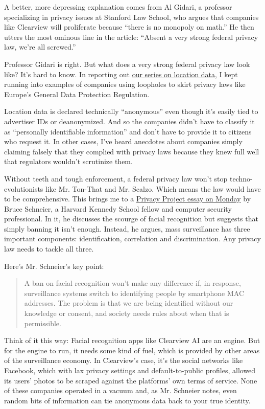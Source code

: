 A better, more depressing explanation comes from Al Gidari, a professor
specializing in privacy issues at Stanford Law School, who argues that
companies like Clearview will proliferate because ``there is no monopoly
on math.'' He then utters the most ominous line in the article: ``Absent
a very strong federal privacy law, we're all screwed.''

Professor Gidari is right. But what does a very strong federal privacy
law look like? It's hard to know. In reporting out
\href{https://www.nytimes.com/interactive/2019/12/19/opinion/location-tracking-cell-phone.html}{our
series on location data}, I kept running into examples of companies
using loopholes to skirt privacy laws like Europe's General Data
Protection Regulation.

Location data is declared technically ``anonymous'' even though it's
easily tied to advertiser IDs or deanonymized. And so the companies
didn't have to classify it as ``personally identifiable information''
and don't have to provide it to citizens who request it. In other cases,
I've heard anecdotes about companies simply claiming falsely that they
complied with privacy laws because they knew full well that regulators
wouldn't scrutinize them.

Without teeth and tough enforcement, a federal privacy law won't stop
techno-evolutionists like Mr. Ton-That and Mr. Scalzo. Which means the
law would have to be comprehensive. This brings me to a
\href{https://www.nytimes.com/2020/01/20/opinion/facial-recognition-ban-privacy.html}{Privacy
Project essay on Monday} by Bruce Schneier, a Harvard Kennedy School
fellow and computer security professional. In it, he discusses the
scourge of facial recognition but suggests that simply banning it isn't
enough. Instead, he argues, mass surveillance has three important
components: identification, correlation and discrimination. Any privacy
law needs to tackle all three.

Here's Mr. Schneier's key point:

\begin{quote}
A ban on facial recognition won't make any difference if, in response,
surveillance systems switch to identifying people by smartphone MAC
addresses. The problem is that we are being identified without our
knowledge or consent, and society needs rules about when that is
permissible.
\end{quote}

Think of it this way: Facial recognition apps like Clearview AI are an
engine. But for the engine to run, it needs some kind of fuel, which is
provided by other areas of the surveillance economy. In Clearview's
case, it's the social networks like Facebook, which with lax privacy
settings and default-to-public profiles, allowed its users' photos to be
scraped against the platforms' own terms of service. None of these
companies operated in a vacuum and, as Mr. Schneier notes, even random
bits of information can tie anonymous data back to your true identity.

